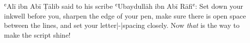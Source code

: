 ʿAlī ibn Abī Ṭālib said to his scribe ʿUbaydullāh ibn Abī Rāfiʿ: Set down your
inkwell before you, sharpen the edge of your pen, make sure there is open space
between the lines, and set your letter|-|spacing closely. Now {\em that} is the
way to make the script shine!
